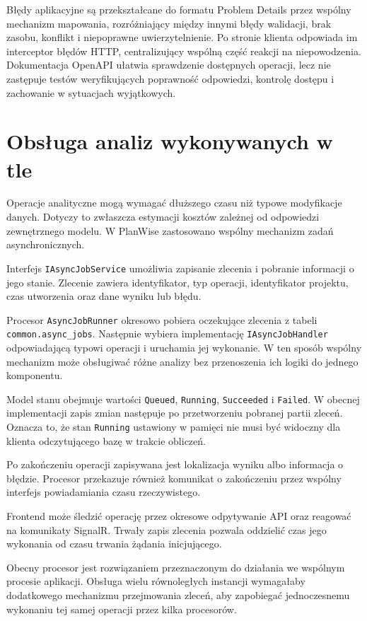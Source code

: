Błędy aplikacyjne są przekształcane do formatu Problem Details przez wspólny mechanizm mapowania, rozróżniający między innymi błędy walidacji, brak zasobu, konflikt i niepoprawne uwierzytelnienie. Po stronie klienta odpowiada im interceptor błędów HTTP, centralizujący wspólną część reakcji na niepowodzenia. Dokumentacja OpenAPI ułatwia sprawdzenie dostępnych operacji, lecz nie zastępuje testów weryfikujących poprawność odpowiedzi, kontrolę dostępu i zachowanie w sytuacjach wyjątkowych.

\section{Obsługa analiz wykonywanych w tle}

Operacje analityczne mogą wymagać dłuższego czasu niż typowe modyfikacje danych. Dotyczy to zwłaszcza estymacji kosztów zależnej od odpowiedzi zewnętrznego modelu. W PlanWise zastosowano wspólny mechanizm zadań asynchronicznych.

Interfejs \texttt{IAsyncJobService} umożliwia zapisanie zlecenia i pobranie informacji o jego stanie. Zlecenie zawiera identyfikator, typ operacji, identyfikator projektu, czas utworzenia oraz dane wyniku lub błędu.

Procesor \texttt{AsyncJobRunner} okresowo pobiera oczekujące zlecenia z tabeli \texttt{common.async\_jobs}. Następnie wybiera implementację \texttt{IAsyncJobHandler} odpowiadającą typowi operacji i uruchamia jej wykonanie. W ten sposób wspólny mechanizm może obsługiwać różne analizy bez przenoszenia ich logiki do jednego komponentu.

Model stanu obejmuje wartości \texttt{Queued}, \texttt{Running}, \texttt{Succeeded} i \texttt{Failed}. W obecnej implementacji zapis zmian następuje po przetworzeniu pobranej partii zleceń. Oznacza to, że stan \texttt{Running} ustawiony w pamięci nie musi być widoczny dla klienta odczytującego bazę w trakcie obliczeń.

Po zakończeniu operacji zapisywana jest lokalizacja wyniku albo informacja o błędzie. Procesor przekazuje również komunikat o zakończeniu przez wspólny interfejs powiadamiania czasu rzeczywistego.

Frontend może śledzić operację przez okresowe odpytywanie API oraz reagować na komunikaty SignalR. Trwały zapis zlecenia pozwala oddzielić czas jego wykonania od czasu trwania żądania inicjującego.

Obecny procesor jest rozwiązaniem przeznaczonym do działania we wspólnym procesie aplikacji. Obsługa wielu równoległych instancji wymagałaby dodatkowego mechanizmu przejmowania zleceń, aby zapobiegać jednoczesnemu wykonaniu tej samej operacji przez kilka procesorów.

